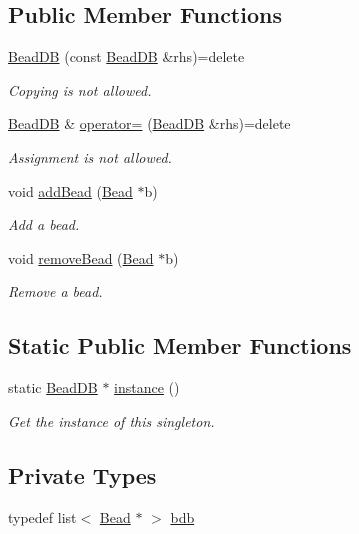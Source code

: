 \subsection*{Public Member Functions}
\begin{DoxyCompactItemize}
\item 
\hyperlink{classBeadDB_a47d7b62ae87aeffb76e6ded2798188ac}{Bead\+D\+B} (const \hyperlink{classBeadDB}{Bead\+D\+B} \&rhs)=delete
\begin{DoxyCompactList}\small\item\em Copying is not allowed. \end{DoxyCompactList}\item 
\hyperlink{classBeadDB}{Bead\+D\+B} \& \hyperlink{classBeadDB_a7e9c6a6635a39aa7cb4f18c1103df01d}{operator=} (\hyperlink{classBeadDB}{Bead\+D\+B} \&rhs)=delete
\begin{DoxyCompactList}\small\item\em Assignment is not allowed. \end{DoxyCompactList}\item 
void \hyperlink{classBeadDB_a2c4d09dbcad9f65129308ae570583134}{add\+Bead} (\hyperlink{classBead}{Bead} $\ast$b)
\begin{DoxyCompactList}\small\item\em Add a bead. \end{DoxyCompactList}\item 
void \hyperlink{classBeadDB_aa5069d3136246c17201f3d49c3e96405}{remove\+Bead} (\hyperlink{classBead}{Bead} $\ast$b)
\begin{DoxyCompactList}\small\item\em Remove a bead. \end{DoxyCompactList}\end{DoxyCompactItemize}
\subsection*{Static Public Member Functions}
\begin{DoxyCompactItemize}
\item 
static \hyperlink{classBeadDB}{Bead\+D\+B} $\ast$ \hyperlink{classBeadDB_a7a57dea5ef46dff11f7589d00d05a4c0}{instance} ()
\begin{DoxyCompactList}\small\item\em Get the instance of this singleton. \end{DoxyCompactList}\end{DoxyCompactItemize}
\subsection*{Private Types}
\begin{DoxyCompactItemize}
\item 
typedef list$<$ \hyperlink{classBead}{Bead} $\ast$ $>$ \hyperlink{classBeadDB_a0312ccca7bb1de087f91481aec353d60}{bdb}
\end{DoxyCompactItemize}
